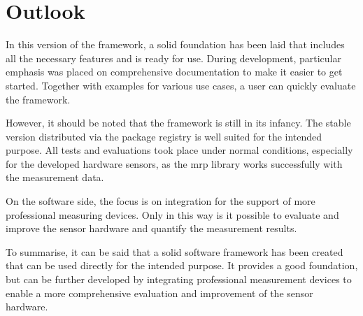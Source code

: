 \hypertarget{outlook}{%
\section{Outlook}\label{outlook}}

In this version of the framework, a solid foundation has been laid that
includes all the necessary features and is ready for use. During
development, particular emphasis was placed on comprehensive
documentation to make it easier to get started. Together with examples
for various use cases, a user can quickly evaluate the framework.

However, it should be noted that the framework is still in its infancy.
The stable version distributed via the package registry is well suited
for the intended purpose. All tests and evaluations took place under
normal conditions, especially for the developed hardware sensors, as the
\gls{mrp} library works successfully with the measurement data.

On the software side, the focus is on integration for the support of
more professional measuring devices. Only in this way is it possible to
evaluate and improve the sensor hardware and quantify the measurement
results.

To summarise, it can be said that a solid software framework has been
created that can be used directly for the intended purpose. It provides
a good foundation, but can be further developed by integrating
professional measurement devices to enable a more comprehensive
evaluation and improvement of the sensor hardware.


